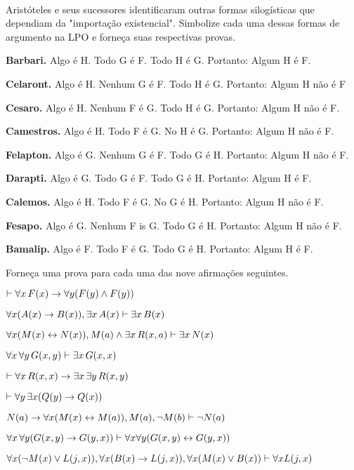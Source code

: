 \
 
\problempart
\label{pr.BarbaraEtc.proof2}
Arist\'oteles e seus sucessores identificaram outras formas silog\'isticas que dependiam da "importa\c c\~ao existencial". Simbolize cada uma dessas formas de argumento na LPO e  forne\c ca suas respectivas  provas.
\begin{earg}
	\item \textbf{Barbari.} Algo \'e H. Todo G \'e F. Todo H \'e G. Portanto: Algum H \'e F.
	\item \textbf{Celaront.} Algo \'e H. Nenhum G \'e F. Todo H \'e G. Portanto: Algum H n\~ao \'e F
	\item \textbf{Cesaro.} Algo \'e H. Nenhum F \'e G. Todo H \'e G. Portanto: Algum H n\~ao \'e  F.
	\item \textbf{Camestros.} Algo \'e H. Todo F \'e G. No H \'e G. Portanto: Algum H n\~ao \'e F.
	\item \textbf{Felapton.} Algo \'e G. Nenhum G \'e F. Todo G \'e H. Portanto: Algum H n\~ao \'e F.
	\item \textbf{Darapti.} Algo \'e G. Todo G \'e F. Todo G \'e H. Portanto: Algum H \'e F.
	\item \textbf{Calemos.} Algo \'e H. Todo F \'e G. No G \'e H. Portanto: Algum H n\~ao \'e F.
	\item \textbf{Fesapo.} Algo \'e G. Nenhum F is G. Todo G \'e H. Portanto: Algum H n\~ao \'e F.
	\item \textbf{Bamalip.} Algo \'e F. Todo F \'e G. Todo G \'e H. Portanto: Algum H \'e F.
\end{earg}

\problempart
\label{pr.someFOLproofs}
Forne\c ca uma prova para cada uma das nove afirma\c c\~oes seguintes. 
\begin{earg}
\item $\vdash \forall x\,\mathord{F}(x) \rightarrow \forall y(\mathord{F}(y) \wedge \mathord{F}(y))$
\item $\forall x(\mathord{A}(x)\rightarrow \mathord{B}(x)), \exists x\,\mathord{A}(x) \vdash \exists x\,\mathord{B}(x)$
\item $\forall x(\mathord{M}(x) \leftrightarrow \mathord{N}(x)), \mathord{M}(a) \wedge \exists x\,\mathord{R}(x,a) \vdash \exists x\,\mathord{N}(x)$
\item $\forall x\, \forall y\,\mathord{G}(x,y)\vdash\exists x\,\mathord{G}(x,x)$
\item $\vdash\forall x\,\mathord{R}(x,x) \rightarrow \exists x\, \exists y\,\mathord{R}(x,y)$
\item $\vdash\forall y\, \exists x (\mathord{Q}(y) \rightarrow \mathord{Q}(x))$
\item $\mathord{N}(a) \rightarrow \forall x(\mathord{M}(x) \leftrightarrow \mathord{M}(a)), \mathord{M}(a), \neg\mathord{M}(b)\vdash \neg \mathord{N}(a)$
\item $\forall x\, \forall y (\mathord{G}(x,y) \rightarrow \mathord{G}(y,x)) \vdash \forall x\forall y (\mathord{G}(x,y) \leftrightarrow \mathord{G}(y,x))$
\item $\forall x(\neg\mathord{M}(x) \vee \mathord{L}(j,x)), \forall x(\mathord{B}(x)\rightarrow \mathord{L}(j,x)), \forall x(\mathord{M}(x)\vee \mathord{B}(x))\vdash \forall x\mathord{L}(j,x)$
\end{earg}
 
